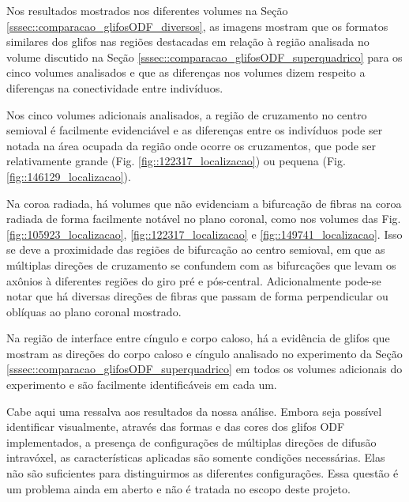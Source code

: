 Nos resultados mostrados nos diferentes volumes na Seção \ref{sssec::comparacao_glifosODF_diversos}, as imagens mostram que os formatos similares dos glifos nas regiões destacadas em relação à região analisada no volume discutido na Seção \ref{sssec::comparacao_glifosODF_superquadrico} para os cinco volumes analisados e que as diferenças nos volumes dizem respeito a diferenças na conectividade entre indivíduos.

Nos cinco volumes adicionais analisados, a região de cruzamento no centro semioval é facilmente evidenciável e as diferenças entre os indivíduos pode ser notada na área ocupada da região onde ocorre os cruzamentos, que pode ser relativamente grande (Fig. \ref{fig::122317_localizacao}) ou pequena (Fig. \ref{fig::146129_localizacao}).

Na coroa radiada, há volumes que não evidenciam a bifurcação de fibras na coroa radiada de forma facilmente notável no plano coronal, como nos volumes das Fig. \ref{fig::105923_localizacao}, \ref{fig::122317_localizacao} e \ref{fig::149741_localizacao}. Isso se deve a proximidade das regiões de bifurcação ao centro semioval, em que as múltiplas direções de cruzamento se confundem com as bifurcações que levam os axônios à diferentes regiões do giro pré e pós-central. Adicionalmente pode-se notar que há diversas direções de fibras que passam de forma perpendicular ou oblíquas ao plano coronal mostrado.

Na região de interface entre cíngulo e corpo caloso, há a evidência de glifos que mostram as direções do corpo caloso e cíngulo analisado no experimento da Seção \ref{sssec::comparacao_glifosODF_superquadrico} em todos os volumes adicionais do experimento e são facilmente identificáveis em cada um.


Cabe aqui uma ressalva aos resultados da nossa análise. Embora seja possível identificar visualmente, através das formas e das cores dos glifos ODF implementados, a presença de configurações de múltiplas direções de difusão intravóxel, as características aplicadas são somente condições necessárias. Elas não são suficientes para distinguirmos as diferentes configurações. Essa questão é um problema ainda em aberto \cite{SCHILLING2019194} e não é tratada no escopo deste projeto.

